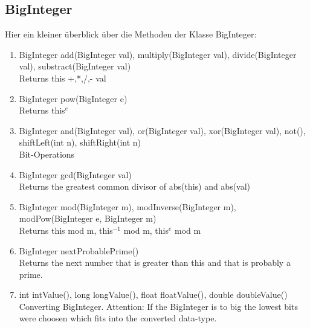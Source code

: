 \subsection{BigInteger}

Hier ein kleiner überblick über die Methoden der Klasse BigInteger: \\

\begin{enumerate}
\item BigInteger add(BigInteger val), multiply(BigInteger val), divide(BigInteger val), substract(BigInteger val) \\ 
Returns this +,*,/,- val
\item BigInteger pow(BigInteger e) \\ Returns this\(^e\)
\item BigInteger and(BigInteger val), or(BigInteger val), xor(BigInteger val), not(), shiftLeft(int n), shiftRight(int n) \\ 
Bit-Operations
\item BigInteger gcd(BigInteger val) \\ Returns the greatest common divisor of abs(this) and abs(val)
\item BigInteger mod(BigInteger m), modInverse(BigInteger m), modPow(BigInteger e, BigInteger m) \\
Returns this mod m, this\(^{-1}\) mod m, this\(^e\) mod m
\item BigInteger  nextProbablePrime() \\ Returns the next number that is greater than this and that is probably a prime.
\item int intValue(), long longValue(), float floatValue(), double doubleValue() \\ 
Converting BigInteger. Attention: If the BigInteger is to big the lowest bits were choosen which fits into the converted data-type.
\end{enumerate}
